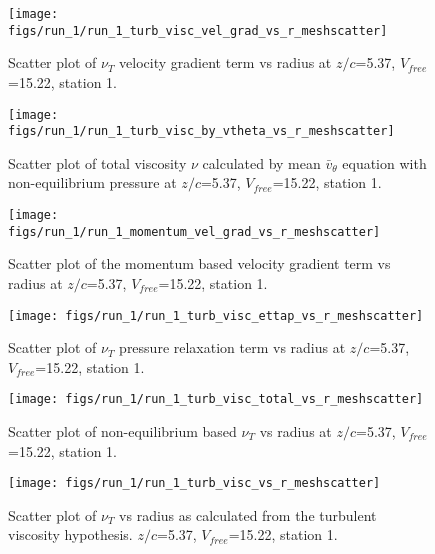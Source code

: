 \begin{figure}[H]
\centering
\texttt{[image: figs/run\_1/run\_1\_turb\_visc\_vel\_grad\_vs\_r\_meshscatter]}
\caption{Scatter plot of $\nu_T$ velocity gradient term vs radius at $z/c$=5.37, $V_{free}$=15.22, station 1.}
\end{figure}


\begin{figure}[H]
\centering
\texttt{[image: figs/run\_1/run\_1\_turb\_visc\_by\_vtheta\_vs\_r\_meshscatter]}
\caption{Scatter plot of total viscosity $\nu$ calculated by mean $\bar{v}_{\theta}$ equation with non-equilibrium pressure at $z/c$=5.37, $V_{free}$=15.22, station 1.}
\end{figure}


\begin{figure}[H]
\centering
\texttt{[image: figs/run\_1/run\_1\_momentum\_vel\_grad\_vs\_r\_meshscatter]}
\caption{Scatter plot of the momentum based velocity gradient term vs radius at $z/c$=5.37, $V_{free}$=15.22, station 1.}
\end{figure}


\begin{figure}[H]
\centering
\texttt{[image: figs/run\_1/run\_1\_turb\_visc\_ettap\_vs\_r\_meshscatter]}
\caption{Scatter plot of $\nu_T$ pressure relaxation term vs radius at $z/c$=5.37, $V_{free}$=15.22, station 1.}
\end{figure}


\begin{figure}[H]
\centering
\texttt{[image: figs/run\_1/run\_1\_turb\_visc\_total\_vs\_r\_meshscatter]}
\caption{Scatter plot of non-equilibrium based $\nu_T$ vs radius at $z/c$=5.37, $V_{free}$=15.22, station 1.}
\end{figure}


\begin{figure}[H]
\centering
\texttt{[image: figs/run\_1/run\_1\_turb\_visc\_vs\_r\_meshscatter]}
\caption{Scatter plot of $\nu_T$ vs radius as calculated from the turbulent viscosity hypothesis. $z/c$=5.37, $V_{free}$=15.22, station 1.}
\end{figure}


